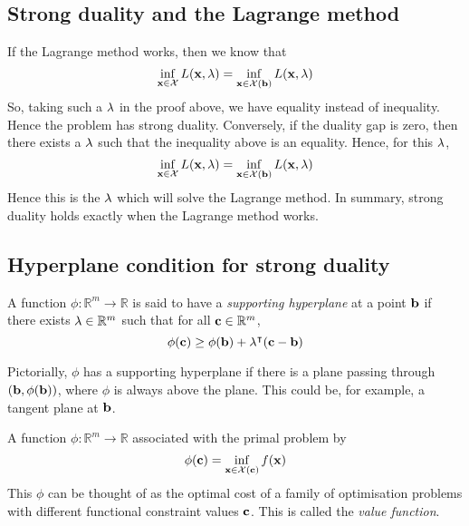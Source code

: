 \subsection{Strong duality and the Lagrange method}
If the Lagrange method works, then we know that
\[
	\inf_{\vb x \in \mathcal X} L(\vb x, \vb \lambda) = \inf_{\vb x \in \mathcal X(\vb b)} L(\vb x, \vb \lambda)
\]
So, taking such a \( \vb \lambda \) in the proof above, we have equality instead of inequality.
Hence the problem has strong duality.
Conversely, if the duality gap is zero, then there exists a \( \vb \lambda \) such that the inequality above is an equality.
Hence, for this \( \vb \lambda \),
\[
	\inf_{\vb x \in \mathcal X} L(\vb x, \vb \lambda) = \inf_{\vb x \in \mathcal X(\vb b)} L(\vb x, \vb \lambda)
\]
Hence this is the \( \vb \lambda \) which will solve the Lagrange method.
In summary, strong duality holds exactly when the Lagrange method works.

\subsection{Hyperplane condition for strong duality}
\begin{definition}
	A function \( \phi \colon \mathbb R^m \to \mathbb R \) is said to have a \textit{supporting hyperplane} at a point \( \vb b \) if there exists \( \vb \lambda \in \mathbb R^m \) such that for all \( \vb c \in \mathbb R^m \),
	\[
		\phi(\vb c) \geq \phi(\vb b) + \vb\lambda^\intercal (\vb c - \vb b)
	\]
\end{definition}
\noindent Pictorially, \( \phi \) has a supporting hyperplane if there is a plane passing through \( (\vb b, \phi(\vb b)) \), where \( \phi \) is always above the plane.
This could be, for example, a tangent plane at \( \vb b \).

\begin{definition}
	A function \( \phi \colon \mathbb R^m \to \mathbb R \) associated with the primal problem by
	\[
		\phi(\vb c) = \inf_{\vb x \in \mathcal X(\vb c)} f(\vb x)
	\]
	This \( \phi \) can be thought of as the optimal cost of a family of optimisation problems with different functional constraint values \( \vb c \).
	This is called the \textit{value function}.
\end{definition}

